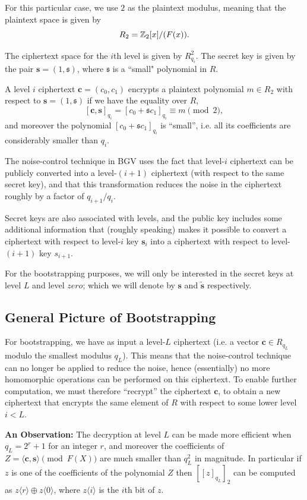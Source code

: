 \documentclass[12pt]{article}
\theoremstyle{plain}
\theoremstyle{definition}
\theoremstyle{remark}
\begin{document}
For this particular case, we use $2$ as the plaintext modulus, meaning that the plaintext space is given by
$$R_2 = \mathbb{Z}_2[x]/(F(x)).$$

The ciphertext space for the $i$th level is given by $R_{q_i}^2$. The secret key is given by the pair $\mathbf{s} = (1, \mathfrak{s})$, where $\mathfrak{s}$ is a ``small" polynomial in $R$.

A level $i$ ciphertext $\mathbf{c} = (c_0, c_1)$ encrypts a plaintext polynomial $m \in R_2$ with respect to $\mathbf{s} = (1, \mathfrak{s})$ if we have the equality over $R$,
$$[\mathbf{c}, \mathbf{s}]_{q_i} = [c_0 + \mathfrak{s}c_1]_{q_i} \equiv m \pmod{2},$$
and moreover the polynomial $[c_0 + \mathfrak{s}c_1]_{q_i}$ is ``small”, i.e. all its coefficients are considerably smaller than $q_i$.

The noise-control technique in BGV uses the fact that level-$i$ ciphertext can be publicly converted into a level-$(i + 1)$ ciphertext (with respect to the same secret key), and that this transformation reduces the noise in the ciphertext roughly by a factor of $q_{i+1}/q_i$.

Secret keys are also associated with levels, and the public key includes some additional information that (roughly speaking) makes it possible to convert a ciphertext with respect to level-$i$ key $\mathbf{s}_i$ into a ciphertext with respect to level-$(i + 1)$ key $s_{i+1}$.

For the bootstrapping purposes, we will only be interested in the secret keys at level $L$ and level $zero$;
which we will denote by $\mathbf{s}$ and $\tilde{\mathbf{s}}$ respectively.

\subsection{General Picture of Bootstrapping}
For bootstrapping, we have as input a level-$L$ ciphertext (i.e. a vector $\mathbf{c} \in R_{q_L}$ modulo the smallest modulus $q_L$). This means that the noise-control technique can no longer be applied to reduce the noise, hence (essentially) no more homomorphic operations can be performed on this ciphertext. To enable further computation, we must therefore ``recrypt” the ciphertext $\mathbf{c}$, to obtain a new ciphertext that encrypts the same element of $R$ with respect to some lower level $i <L$.

{\bf An Observation:} The decryption at level $L$ can be made more efficient when
$q_L = 2^r+1$ for an integer $r$, and moreover
the coefficients of $Z = \langle \mathbf{c}, \mathbf{s}\rangle \pmod{F(X)}$ are much smaller than $q_L^2$ in magnitude.
In particular if $z$ is one of the coefficients of the polynomial $Z$ then $[[z]_{q_L}]_2$ can be
computed as $z\langle r \rangle\oplus z\langle 0 \rangle$, where $z\langle i\rangle$ is the $i$th bit of $z$.
\end{document}
